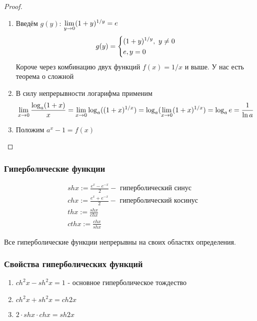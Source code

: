 \begin{proof}
	\begin{enumerate}
		\item Введём $g(y)$: $\lim\limits_{y \to 0} (1 + y)^{1 / y} = e$
		$$
			g(y) = \left\{\begin{aligned}
			&{(1 + y)^{1 / y},\ y \neq 0}
			\\
			&{e, y = 0}
			\end{aligned}\right.
		$$
		Короче через комбинацию двух функций $f(x) = 1/x$ и выше. У нас есть теорема о сложной
		
		\item В силу непрерывности логарифма применим
		$$
			\lim\limits_{x \to 0} \frac{\log_a (1 + x)}{x} = \lim\limits_{x \to 0} \log_a((1 + x)^{1 / x}) = \log_a(\lim\limits_{x \to 0} (1 + x)^{1 / x}) = \log_a e = \frac{1}{\ln a}
		$$
		
		\item Положим $a^x - 1 = f(x)$ 
		
	\end{enumerate}
\end{proof}

\subsubsection*{Гиперболические функции}

\begin{definition}
	\begin{align*}
		&{sh x := \frac{e^x - e^{-x}}{2} - \text{ гиперболический синус}}
		\\
		&{ch x := \frac{e^x + e^{-x}}{2} - \text{ гиперболический косинус}}
		\\
		&{th x := \frac{sh x}{ch x}}
		\\
		&{cth x := \frac{ch x}{sh x}}
	\end{align*}
\end{definition}

Все гиперболические функции непрерывны на своих областях определения.

\subsubsection*{Свойства гиперболических функций}

\begin{enumerate}
	\item $ch^2 x - sh^2 x = 1$ - основное гиперболическое тождество
	\item $ch^2 x + sh^2 x = ch 2x$
	\item $2 \cdot sh x \cdot ch x = sh 2x$
\end{enumerate}

